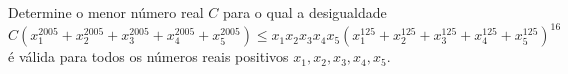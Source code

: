 Determine o menor número real $C$ para o qual a desigualdade
$$C (x_1^{2005} +
     x_2^{2005} +
     x_3^{2005} +
     x_4^{2005} +
     x_5^{2005})  \le 
                      x_1x_2x_3x_4x_5
                      (x_1^{125} +
                       x_2^{125} +
                       x_3^{125} +
                       x_4^{125} +
                       x_5^{125})^{16}$$
é válida para todos os números reais positivos $x_1, x_2, x_3, x_4, x_5$.